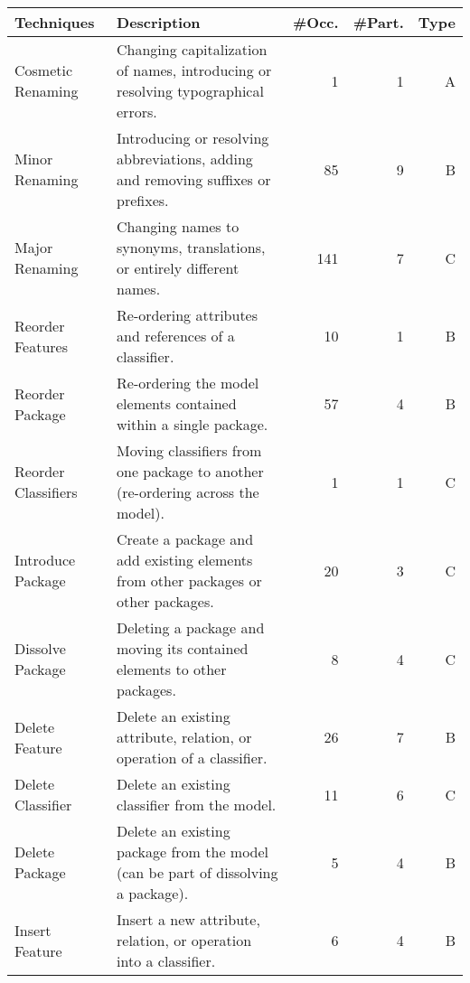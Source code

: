 \begin{table*}[t]
	\centering
    \small
	\begin{tabular}{l p{215pt} r r r} %
		\toprule
		Techniques         & Description                                                                       & \footnotesize\#Occ. & \footnotesize\#Part. & \footnotesize Type\\
		\midrule
		Cosmetic Renaming  & Changing capitalization of names, introducing or resolving typographical errors.                 & 1    & 1    & A                     \\
		Minor Renaming     & Introducing or resolving abbreviations, adding and removing suffixes or prefixes. & 85   & 9    & B                     \\
		Major Renaming     & Changing names to synonyms, translations, or entirely different names.            & 141  & 7    & C                     \\
		\midrule
		Reorder Features  & Re-ordering attributes and references of a classifier.                            & 10   & 1    & B                     \\
		Reorder Package   & Re-ordering the model elements contained within a single package.                       & 57   & 4    & B                     \\
		Reorder Classifiers & Moving classifiers from one package to another (re-ordering across the model).  & 1    & 1    & C                     \\
		\midrule
		Introduce Package  & Create a package and add existing elements from other packages or other packages. & 20   & 3    & C                     \\
		Dissolve Package   & Deleting a package and moving its contained elements to other packages.           & 8    & 4    & C                     \\
		\midrule
		Delete Feature     & Delete an existing attribute, relation, or operation of a classifier.             & 26   & 7    & B                     \\
		Delete Classifier  & Delete an existing classifier from the model.                                     & 11   & 6    & C                     \\
		Delete Package     & Delete an existing package from the model (can be part of dissolving a package).  & 5    & 4    & B                     \\
		\midrule
        Insert Feature     & Insert a new attribute, relation, or operation into a classifier.                 & 6    & 4    & B                     \\

\end{tabular}
\end{table*}
